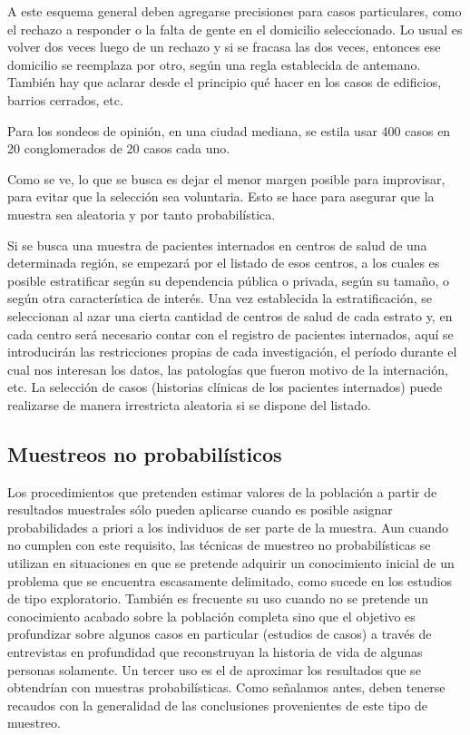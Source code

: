 \documentclass[]{article}
\begin{document}
A este esquema general deben agregarse precisiones para casos
particulares, como el rechazo a responder o la falta de gente en el
domicilio seleccionado. Lo usual es volver dos veces luego de un rechazo y si se fracasa las dos veces, entonces ese domicilio se reemplaza por otro, según una regla establecida de antemano. También hay que aclarar desde el principio qué hacer en los casos de edificios, barrios cerrados, etc.

Para los sondeos de opinión, en una ciudad mediana, se estila usar 400
casos en 20 conglomerados de 20 casos cada uno.

Como se ve, lo que se busca es dejar el menor margen posible para
improvisar, para evitar que la selección sea voluntaria. Esto se hace
para asegurar que la muestra sea aleatoria y por tanto probabilística.

Si se busca una muestra de pacientes internados en centros de salud de
una determinada región, se empezará por el listado de esos centros, a
los cuales es posible estratificar según su dependencia pública o
privada, según su tamaño, o según otra característica de interés. Una
vez establecida la estratificación, se seleccionan al azar una cierta
cantidad de centros de salud de cada estrato y, en cada centro será
necesario contar con el registro de pacientes internados, aquí se
introducirán las restricciones propias de cada investigación, el período
durante el cual nos interesan los datos, las patologías que fueron
motivo de la internación, etc. La selección de casos (historias clínicas
de los pacientes internados) puede realizarse de manera irrestricta
aleatoria si se dispone del listado.

\hypertarget{muestreos-no-probabilisticos}{%
\subsection{Muestreos no probabilísticos}\label{muestreos-no-probabilisticos}}

Los procedimientos que pretenden estimar valores de la población a
partir de resultados muestrales sólo pueden aplicarse cuando es posible
asignar probabilidades a priori a los individuos de ser parte de la
muestra. Aun cuando no cumplen con este requisito, las técnicas de
muestreo no probabilísticas se utilizan en situaciones en que se
pretende adquirir un conocimiento inicial de un problema que se
encuentra escasamente delimitado, como sucede en los estudios de tipo
exploratorio. También es frecuente su uso cuando no se pretende un
conocimiento acabado sobre la población completa sino que el objetivo es
profundizar sobre algunos casos en particular (estudios de casos) a
través de entrevistas en profundidad que reconstruyan la historia de
vida de algunas personas solamente. Un tercer uso es el de aproximar los
resultados que se obtendrían con muestras probabilísticas. Como
señalamos antes, deben tenerse recaudos con la generalidad de las
conclusiones provenientes de este tipo de muestreo.
\end{document}
